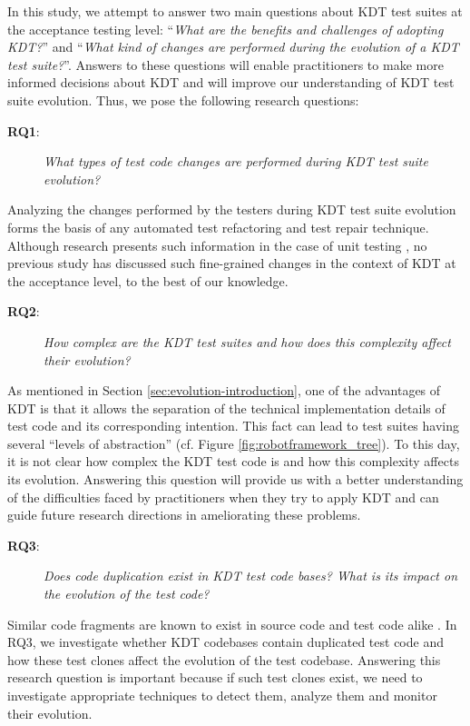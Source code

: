 In this study, we attempt to answer two main questions about KDT test suites at the acceptance testing level: ``\emph{What are the benefits and challenges of adopting KDT?}''  and ``\emph{What kind of changes are performed during the evolution of a KDT test suite?}''. Answers to these questions will enable practitioners to make more informed decisions about KDT and will improve our understanding of KDT test suite evolution. Thus, we pose the following research questions:

\begin{description}
\item[\textbf{RQ1}:] \emph{What types of test code changes are performed during KDT test suite evolution?}
\end{description}

Analyzing the changes performed by the testers during KDT test suite evolution forms the basis of any automated test refactoring and test repair technique. Although research presents such information in the case of unit testing \cite{Pinto2012}, no previous study has discussed such fine-grained changes in the context of KDT at the acceptance level, to the best of our
knowledge.

\begin{description}
\item[\textbf{RQ2}:] \emph{How complex are the KDT test suites and how does this complexity affect their evolution?}
\end{description}

As mentioned in Section \ref{sec:evolution-introduction}, one of the advantages of KDT is that it allows the separation of the technical implementation details of test code and its corresponding intention. This fact can lead to test suites having several ``levels of abstraction'' (cf. Figure \ref{fig:robotframework_tree}). To this day, it is not clear how complex the KDT test code is and how this complexity affects its evolution. Answering this question will provide us with a better understanding of the difficulties faced by practitioners when they try to apply KDT and can guide future research directions in ameliorating these problems.

\begin{description}
\item[\textbf{RQ3}:] \emph{Does code duplication exist in KDT test code bases? What is its impact on the evolution of the test code?}
\end{description}

Similar code fragments are known to exist in source code and test code alike \cite{Baker1995, Roy2009, Rattan2013, Lavoie2017}. In RQ3, we investigate whether KDT codebases contain duplicated test code and how these test clones affect the evolution of the test codebase. Answering this research question is important because if such test clones exist, we need to investigate appropriate techniques to detect them, analyze them and monitor their evolution.

